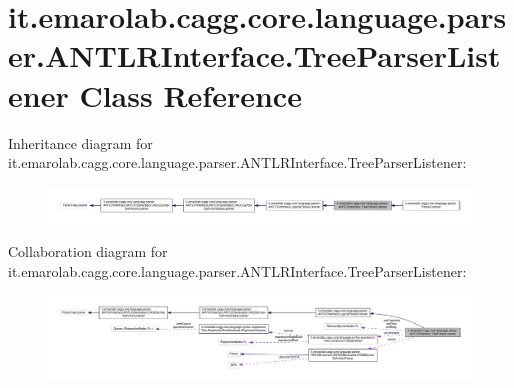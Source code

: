 \hypertarget{classit_1_1emarolab_1_1cagg_1_1core_1_1language_1_1parser_1_1ANTLRInterface_1_1TreeParserListener}{\section{it.\-emarolab.\-cagg.\-core.\-language.\-parser.\-A\-N\-T\-L\-R\-Interface.\-Tree\-Parser\-Listener Class Reference}
\label{classit_1_1emarolab_1_1cagg_1_1core_1_1language_1_1parser_1_1ANTLRInterface_1_1TreeParserListener}
}


Inheritance diagram for it.\-emarolab.\-cagg.\-core.\-language.\-parser.\-A\-N\-T\-L\-R\-Interface.\-Tree\-Parser\-Listener\-:\nopagebreak
\begin{figure}[H]
\begin{center}
\leavevmode
\includegraphics[width=350pt]{classit_1_1emarolab_1_1cagg_1_1core_1_1language_1_1parser_1_1ANTLRInterface_1_1TreeParserListener__inherit__graph}
\end{center}
\end{figure}


Collaboration diagram for it.\-emarolab.\-cagg.\-core.\-language.\-parser.\-A\-N\-T\-L\-R\-Interface.\-Tree\-Parser\-Listener\-:\nopagebreak
\begin{figure}[H]
\begin{center}
\leavevmode
\includegraphics[width=350pt]{classit_1_1emarolab_1_1cagg_1_1core_1_1language_1_1parser_1_1ANTLRInterface_1_1TreeParserListener__coll__graph}
\end{center}
\end{figure}
